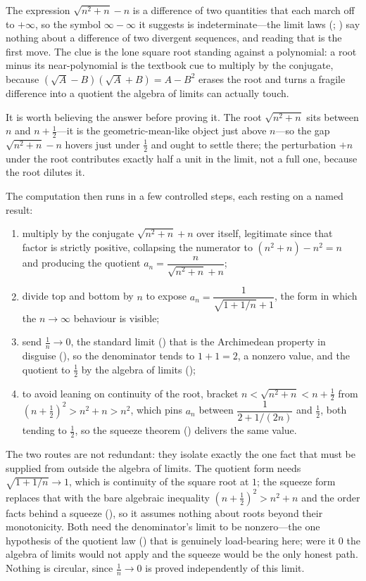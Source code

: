 \documentclass[main.tex]{subfiles}
\begin{document}
\begin{Reflection}
The expression $\sqrt{n^2+n}-n$ is a difference of two quantities that each march off to $+\infty$, so
the symbol $\infty-\infty$ it suggests is indeterminate---the limit laws (;
) say nothing about a difference of two
divergent sequences, and reading that is the first move. The clue is the lone square root standing
against a polynomial: a root minus its near-polynomial is the textbook cue to multiply by the
conjugate, because $(\sqrt A-B)(\sqrt A+B)=A-B^2$ erases the root and turns a fragile difference into a
quotient the algebra of limits can actually touch.

It is worth believing the answer before proving it. The root $\sqrt{n^2+n}$ sits between $n$ and
$n+\tfrac12$---it is the geometric-mean-like object just above $n$---so the gap $\sqrt{n^2+n}-n$ hovers
just under $\tfrac12$ and ought to settle there; the perturbation $+n$ under the root contributes
exactly half a unit in the limit, not a full one, because the root dilutes it.

The computation then runs in a few controlled steps, each resting on a named result:
\begin{enumerate}[leftmargin=1.7em,itemsep=3pt,topsep=2pt,label=\textnormal{(\arabic*)}]
  \item multiply by the conjugate $\sqrt{n^2+n}+n$ over itself, legitimate since that factor is
        strictly positive, collapsing the numerator to $(n^2+n)-n^2=n$ and producing the quotient
        $a_n=\dfrac{n}{\sqrt{n^2+n}+n}$;
  \item divide top and bottom by $n$ to expose $a_n=\dfrac{1}{\sqrt{1+1/n}+1}$, the form in which the
        $n\to\infty$ behaviour is visible;
  \item send $\tfrac1n\to0$, the standard limit () that is the Archimedean property in
        disguise (), so the denominator tends to $1+1=2$, a nonzero
        value, and the quotient to $\tfrac12$ by the algebra of limits ();
  \item to avoid leaning on continuity of the root, bracket $n<\sqrt{n^2+n}<n+\tfrac12$ from
        $(n+\tfrac12)^2>n^2+n>n^2$, which pins $a_n$ between $\dfrac{1}{2+1/(2n)}$ and $\tfrac12$, both
        tending to $\tfrac12$, so the squeeze theorem () delivers the same value.
\end{enumerate}

The two routes are not redundant: they isolate exactly the one fact that must be supplied from outside
the algebra of limits. The quotient form needs $\sqrt{1+1/n}\to1$, which is continuity of the square
root at $1$; the squeeze form replaces that with the bare algebraic inequality
$(n+\tfrac12)^2>n^2+n$ and the order facts behind a squeeze (), so it assumes nothing about
roots beyond their monotonicity. Both need the denominator's limit to be nonzero---the one hypothesis of
the quotient law () that is genuinely load-bearing here; were it $0$ the algebra of limits
would not apply and the squeeze would be the only honest path. Nothing is circular, since
$\tfrac1n\to0$ is proved independently of this limit.


\end{Reflection}
\end{document}
